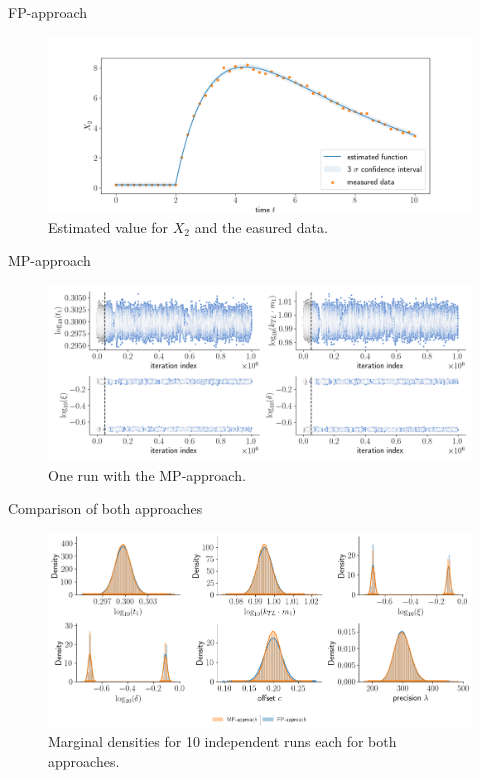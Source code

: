 \documentclass{beamer}
\begin{document}
	\begin{frame}{FP-approach}
		\begin{figure}
			\includegraphics[width=1\columnwidth]
			{plots/combination/mRNA/comparison_data_estimate.png}
			\caption{Estimated value for $X_2$ and the easured data.}
		\end{figure}
	\end{frame}
	
	\begin{frame}{MP-approach}
		\begin{figure}
			\includegraphics[width=1\columnwidth]
			{plots/mRNA_MP/parameters_mRNA_MP_5.png}
			\caption{One run with the MP-approach.}
		\end{figure}
	\end{frame}
	
	\begin{frame}{Comparison of both approaches}
		\begin{figure}
			\includegraphics[width=1\columnwidth]
			{plots/combination/mRNA/overlap_plot_mRNA}
			\caption{Marginal densities for 10 independent runs each for both
			 approaches.}
		\end{figure}
	\end{frame}
	
\end{document}
